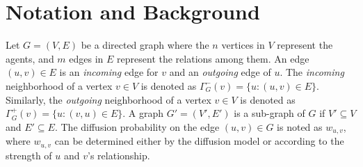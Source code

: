\documentclass[final,5p,times,twocolumn]{elsarticle}
\newcommand\fixme[1]{#1}
\begin{document}

\section{Notation and Background}\label{sec:background}

\fixme{Let $G = (V,E)$ be a} directed \fixme{graph where the $n$ vertices in $V$ represent the agents, and $m$ edges in $E$ represent the relations} among them. An edge $(u,v) \in E$ is an {\em incoming} edge for $v$ and an {\em outgoing} edge of $u$. The {\em incoming} \fixme{neighborhood of a vertex $v \in V$ is denoted as $\Gamma^-_{G}(v) = \{u: (u,v) \in E\}$.} Similarly, the {\em outgoing} neighborhood of a vertex $v \in V$ is denoted as $\Gamma^+_{G}(v) = \{u: (v,u) \in E\}$. A graph $G' = (V',E')$ is a sub-graph of $G$ if $V' \subseteq V$ and $E' \subseteq E$. The diffusion probability on the edge $(u, v) \in G$ is noted as $w_{u,v}$, where $w_{u,v}$ can be determined either by the diffusion model or according to the strength of $u$ and $v$'s relationship.
\end{document}
